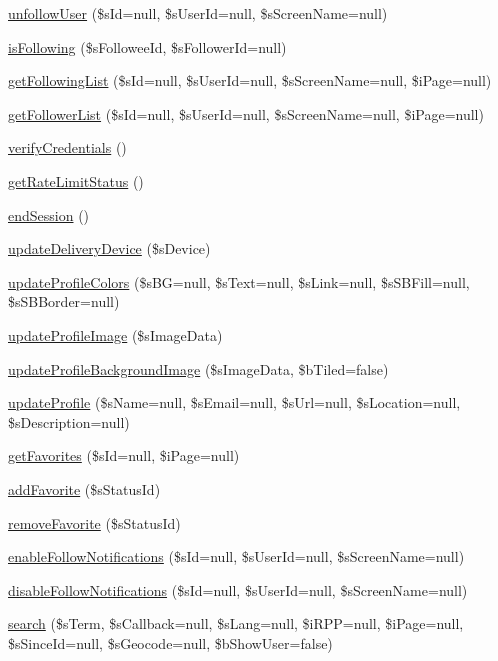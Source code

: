 \begin{DoxyCompactItemize}
\item 
\hyperlink{classCPSTwitterApi_a22c4db8ed439d600b3df10a35e04cb4b}{unfollowUser} (\$sId=null, \$sUserId=null, \$sScreenName=null)
\item 
\hyperlink{classCPSTwitterApi_a7aaa4c2b663fbebca67ae7b162ad364f}{isFollowing} (\$sFolloweeId, \$sFollowerId=null)
\item 
\hyperlink{classCPSTwitterApi_a863d94b36aec6821685a5bbe183ac055}{getFollowingList} (\$sId=null, \$sUserId=null, \$sScreenName=null, \$iPage=null)
\item 
\hyperlink{classCPSTwitterApi_af2da33a5613318a02f93e2ca68722613}{getFollowerList} (\$sId=null, \$sUserId=null, \$sScreenName=null, \$iPage=null)
\item 
\hyperlink{classCPSTwitterApi_aa706fde11e1968f76a5ed19056944fdc}{verifyCredentials} ()
\item 
\hyperlink{classCPSTwitterApi_affa61fcd5f7596b323d31ba8edef8a3b}{getRateLimitStatus} ()
\item 
\hyperlink{classCPSTwitterApi_aa0d57631639ef65ee5030edf92e4974a}{endSession} ()
\item 
\hyperlink{classCPSTwitterApi_aa07192673507be5e4bc9a5d342bd03b7}{updateDeliveryDevice} (\$sDevice)
\item 
\hyperlink{classCPSTwitterApi_a05cd15bda52603c2ca5beb3b7acb0b9d}{updateProfileColors} (\$sBG=null, \$sText=null, \$sLink=null, \$sSBFill=null, \$sSBBorder=null)
\item 
\hyperlink{classCPSTwitterApi_a0a53559d0a53da91dd0af834b2a2379f}{updateProfileImage} (\$sImageData)
\item 
\hyperlink{classCPSTwitterApi_a9022fbca84af34fe395b05e59b3c4612}{updateProfileBackgroundImage} (\$sImageData, \$bTiled=false)
\item 
\hyperlink{classCPSTwitterApi_a12a317aebc0d3877dc8b9222fbdae586}{updateProfile} (\$sName=null, \$sEmail=null, \$sUrl=null, \$sLocation=null, \$sDescription=null)
\item 
\hyperlink{classCPSTwitterApi_a5d957106488cf37b832537826f5bf619}{getFavorites} (\$sId=null, \$iPage=null)
\item 
\hyperlink{classCPSTwitterApi_ab3f7ce72387dc03579a437edcd0b60e5}{addFavorite} (\$sStatusId)
\item 
\hyperlink{classCPSTwitterApi_a0d98584e01bc95f8b8f8a51ff7b1b5e8}{removeFavorite} (\$sStatusId)
\item 
\hyperlink{classCPSTwitterApi_a6580b008521d0b34bdc75f6586d113b1}{enableFollowNotifications} (\$sId=null, \$sUserId=null, \$sScreenName=null)
\item 
\hyperlink{classCPSTwitterApi_a0f563966086bf59e64bc0824be25e4cd}{disableFollowNotifications} (\$sId=null, \$sUserId=null, \$sScreenName=null)
\item 
\hyperlink{classCPSTwitterApi_a1936ab230b38949e6498cff4aebbfd10}{search} (\$sTerm, \$sCallback=null, \$sLang=null, \$iRPP=null, \$iPage=null, \$sSinceId=null, \$sGeocode=null, \$bShowUser=false)
\end{DoxyCompactItemize}
